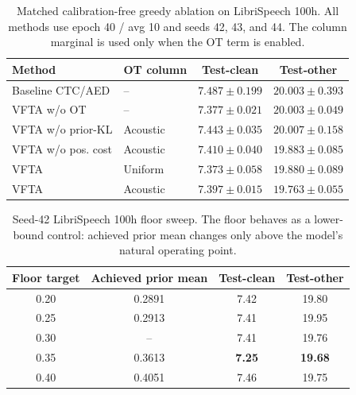 
\begin{table}[t]
  \centering
  \small
  \caption{Matched calibration-free greedy ablation on LibriSpeech 100h.
  All methods use epoch 40 / avg 10 and seeds 42, 43, and 44. The column
  marginal is used only when the OT term is enabled.}
  \label{tab:libri100_complete_greedy_ablation}
  \setlength{\tabcolsep}{4pt}
  \begin{tabular}{llcc}
    \toprule[1.1pt]
    Method & OT column & Test-clean & Test-other \\
    \midrule
    Baseline CTC/AED
      & -- & $7.487 \pm 0.199$
      & $20.003 \pm 0.393$ \\
    VFTA w/o OT
      & -- & $7.377 \pm 0.021$
      & $20.003 \pm 0.049$ \\
    VFTA w/o prior-KL
      & Acoustic & $7.443 \pm 0.035$
      & $20.007 \pm 0.158$ \\
    VFTA w/o pos. cost
      & Acoustic & $7.410 \pm 0.040$
      & $19.883 \pm 0.085$ \\
    VFTA
      & Uniform & $\mathbf{7.373 \pm 0.058}$
      & $19.880 \pm 0.089$ \\
    VFTA
      & Acoustic & $7.397 \pm 0.015$
      & $\mathbf{19.763 \pm 0.055}$ \\
    \bottomrule[1.1pt]
  \end{tabular}
\end{table}

\begin{table}[t]
  \centering
  \small
  \caption{Seed-42 LibriSpeech 100h floor sweep. The floor behaves as a
  lower-bound control: achieved prior mean changes only above the model's
  natural operating point.}
  \label{tab:libri100_floor_sweep}
  \begin{tabular}{cccc}
    \toprule
    Floor target & Achieved prior mean & Test-clean & Test-other \\
    \midrule
    0.20 & 0.2891 & 7.42 & 19.80 \\
    0.25 & 0.2913 & 7.41 & 19.95 \\
    0.30 & --     & 7.41 & 19.76 \\
    0.35 & 0.3613 & \textbf{7.25} & \textbf{19.68} \\
    0.40 & 0.4051 & 7.46 & 19.75 \\
    \bottomrule
  \end{tabular}
\end{table}

